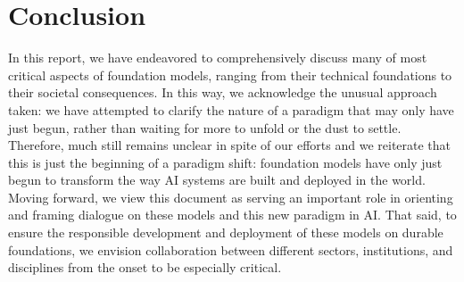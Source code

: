 \section{Conclusion}
\label{sec:conclusion}
In this report, we have endeavored to comprehensively discuss many of most critical aspects of foundation models, ranging from their technical foundations to their societal consequences.
In this way, we acknowledge the unusual approach taken: we have attempted to clarify the nature of a paradigm that may only have just begun, rather than waiting for more to unfold or the dust to settle.
Therefore, much still remains unclear in spite of our efforts and we reiterate that this is just the beginning of a paradigm shift: foundation models have only just begun to transform the way AI systems are built and deployed in the world.
Moving forward, we view this document as serving an important role in orienting and framing dialogue on these models and this new paradigm in AI. 
That said, to ensure the responsible development and deployment of these models on durable foundations, we envision collaboration between different sectors, institutions, and disciplines from the onset to be especially critical. 





